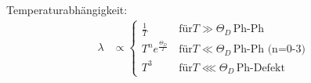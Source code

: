 Temperaturabhängigkeit:
\begin{equation*}
    \begin{aligned}
        \lambda &\propto \begin{cases}
            \frac{1}{T} & \, \text{für} T \gg \Theta_D \, \text{Ph-Ph} \\
            T^ne^{\frac{\Theta_D}{T}} &  \, \text{für} T \ll \Theta_D \, \text{Ph-Ph (n=0-3)} \\
            T^3 & \, \text{für} T \lll \Theta_D \, \text{Ph-Defekt}
            \end{cases} \\
    \end{aligned}
\end{equation*}